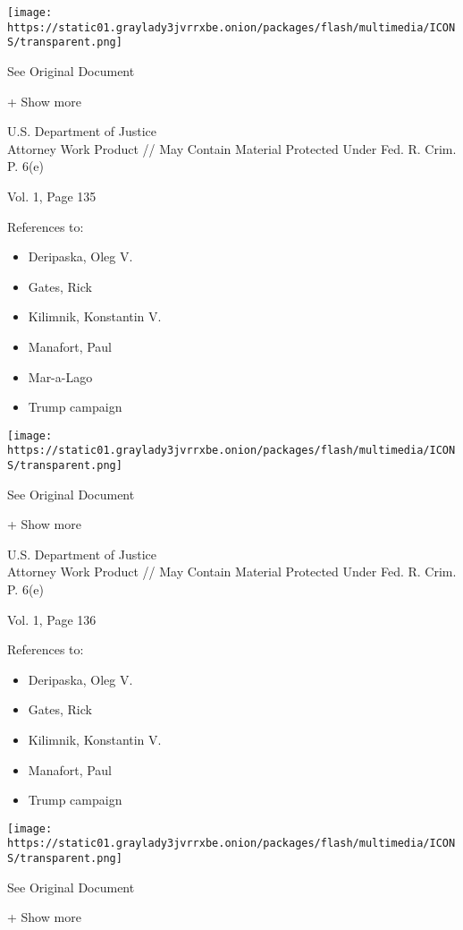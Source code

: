\protect\hyperlink{}{}

\texttt{[image: https://static01.graylady3jvrrxbe.onion/packages/flash/multimedia/ICONS/transparent.png]}

See Original Document

+ Show more

U.S. Department of Justice\\
Attorney Work Product // May Contain Material Protected Under Fed. R.
Crim. P. 6(e)

Vol. 1, Page 135

References to:

\begin{itemize}
\tightlist
\item
  Deripaska, Oleg V.
\item
  Gates, Rick
\item
  Kilimnik, Konstantin V.
\item
  Manafort, Paul 
\item
  Mar-a-Lago
\item
  Trump campaign
\end{itemize}

\protect\hyperlink{}{}

\texttt{[image: https://static01.graylady3jvrrxbe.onion/packages/flash/multimedia/ICONS/transparent.png]}

See Original Document

+ Show more

U.S. Department of Justice\\
Attorney Work Product // May Contain Material Protected Under Fed. R.
Crim. P. 6(e)

Vol. 1, Page 136

References to:

\begin{itemize}
\tightlist
\item
  Deripaska, Oleg V.
\item
  Gates, Rick
\item
  Kilimnik, Konstantin V.
\item
  Manafort, Paul 
\item
  Trump campaign
\end{itemize}

\protect\hyperlink{}{}

\texttt{[image: https://static01.graylady3jvrrxbe.onion/packages/flash/multimedia/ICONS/transparent.png]}

See Original Document

+ Show more

